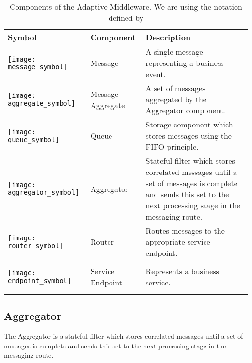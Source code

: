 \begin{table}[htpb]
	\caption{Components of the Adaptive Middleware. We are using the notation defined by \cite{Hohpe:2003fk}}
	\label{table:ch4_middleware_components}
	\centering
	\begin{tabular}{|m{3cm}|m{2cm}|m{5cm}|}
		\hline
		\bfseries Symbol & \bfseries Component & \bfseries Description\\
		\hline 
		\begin{center}
			\texttt{[image: message\_symbol]}
		\end{center} 
		& Message & A single message representing a business event.\\
		\hline 
		\begin{center}
			\texttt{[image: aggregate\_symbol]} 
		\end{center}
		& Message Aggregate & A set of messages aggregated by the Aggregator component.\\
		\hline
		\begin{center}
			\texttt{[image: queue\_symbol]} 
		\end{center}
		& Queue & Storage component which stores messages using the \ac{FIFO} principle.\\
		\hline 
		\begin{center}
			\texttt{[image: aggregator\_symbol]}
		\end{center}
		& Aggregator & Stateful filter which stores correlated messages until a set of messages is complete and sends this set to the next processing stage in the messaging route.\\
		\hline
		\begin{center}
			\texttt{[image: router\_symbol]} 
		\end{center}
		& Router & Routes messages to the appropriate service endpoint.\\
		\hline
		\begin{center}
			\texttt{[image: endpoint\_symbol]} 
		\end{center}
		& Service Endpoint & Represents a business service.\\
		\hline
	\end{tabular}
\end{table}

\subsection{Aggregator}
\label{sec:ch05_aggregator}
The Aggregator is a stateful filter which stores correlated messages until a set of messages is complete and sends this set to the next processing stage in the messaging route. 

